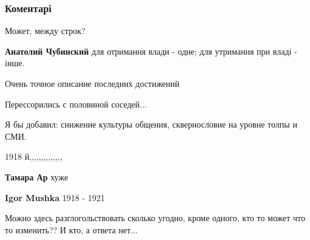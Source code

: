  
 
 
 
 
\subsubsection{Коментарі}
\label{sec:21_11_2021.fb.belokonj_ruslan.1.porobleno_v_ukraini.cmt}

\begin{itemize} %
Может, между строк?

\textbf{Анатолий Чубинский} для отримання влади - одне; для утримання при владі - інше.

Очень точное описание последних достижений

Перессорились с половиной соседей...

Я бы добавил: снижение культуры общения, сквернословие на уровне толпы и СМИ.

1918 й,,,,,,,,,,,,,,

\textbf{Тамара Ар} хуже

\textbf{Igor Mushka} 1918 - 1921


Можно здесь разглогольствовать сколько угодно, кроме одного, кто то может что то
изменить?? И кто, а ответа нет...

\end{itemize} %
